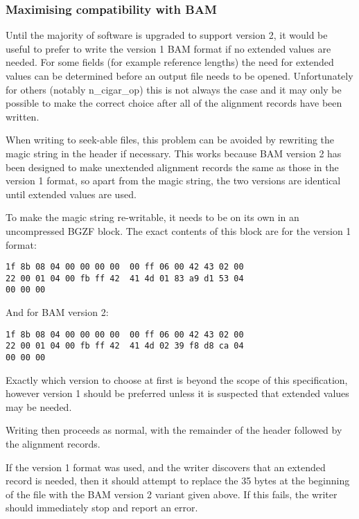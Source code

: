 \documentclass[10pt]{article}
\begin{document}
\subsubsection{Maximising compatibility with BAM}\label{sec:v2-v1-compatibility}

Until the majority of software is upgraded to support version 2,
it would be useful to prefer to write the version 1 BAM format if
no extended values are needed.
For some fields (for example reference lengths) the need for extended values
can be determined before an output file needs to be opened.
Unfortunately for others (notably {\sf n\_cigar\_op}) this is not always the
case and it may only be possible to make the correct choice after all of
the alignment records have been written.

When writing to seek-able files, this problem can be avoided by rewriting
the {\sf magic} string in the header if necessary.
This works because BAM version 2 has been designed to make unextended
alignment records the same as those in the version 1 format, so apart from
the {\sf magic} string, the two versions are identical until extended values
are used.

To make the {\sf magic} string re-writable, it needs to be on its own in
an uncompressed BGZF block.
The exact contents of this block are for the version 1 format:

\begin{verbatim}
1f 8b 08 04 00 00 00 00  00 ff 06 00 42 43 02 00
22 00 01 04 00 fb ff 42  41 4d 01 83 a9 d1 53 04
00 00 00
\end{verbatim}

And for BAM version 2:

\begin{verbatim}
1f 8b 08 04 00 00 00 00  00 ff 06 00 42 43 02 00
22 00 01 04 00 fb ff 42  41 4d 02 39 f8 d8 ca 04
00 00 00
\end{verbatim}

Exactly which version to choose at first is beyond the scope of this
specification, however version 1 should be preferred unless it is suspected
that extended values may be needed.

Writing then proceeds as normal, with the remainder of the header followed
by the alignment records.

If the version 1 format was used, and the writer discovers that an extended
record is needed, then it should attempt to replace the 35 bytes at the
beginning of the file with the BAM version 2 variant given above.
If this fails, the writer should immediately stop and report an error.
\end{document}
